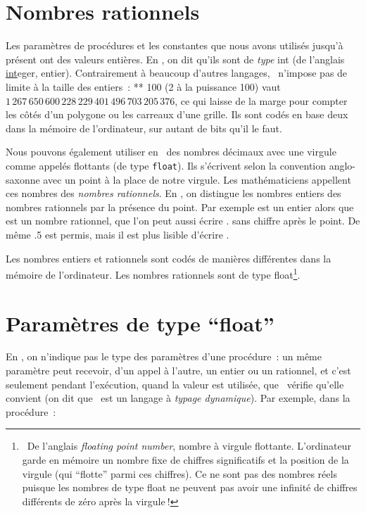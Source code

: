 \section{Nombres rationnels}
Les paramètres de procédures et les constantes que nous avons utilisés jusqu'à
présent ont des valeurs entières. En \python, on dit qu'ils sont de {\em type}
{\idt int} (de l'anglais \underline{int}eger, entier). Contrairement à beaucoup
d'autres langages, \python\ n'impose pas de limite à la taille des entiers~: { ** 100}
(2 à la puissance 100) vaut $1\,267\,650\,600\,228\,229\,401\,496\,703\,205\,376$, ce qui laisse
de la marge pour compter les côtés d'un polygone ou les carreaux d'une grille. Ils sont codés
en base deux dans la mémoire de l'ordinateur, sur autant de bits qu'il le faut.

Nous pouvons également utiliser en \python\ des nombres décimaux avec une virgule comme {} appelés flottants (de type \texttt{float}). Ils
s'écrivent selon la convention anglo-saxonne  avec un point à la place de notre
virgule. Les mathématiciens appellent ces nombres des {\em nombres rationnels}. En \python, on
distingue les nombres entiers des nombres rationnels par la présence du point. Par exemple
{} est un entier alors que {} est un nombre rationnel, que l'on peut
aussi écrire {.} sans chiffre après le point. De même {\idt .5} est permis, mais
il est plus lisible d'écrire {}.

Les nombres entiers et rationnels sont codés de manières différentes dans la mémoire
de l'ordinateur. Les nombres rationnels sont de type {\idt float}\footnote{\ De
l'anglais {\em floating point number}, nombre à virgule flottante. L'ordinateur
garde en mémoire un nombre fixe de chiffres significatifs et la position de la virgule
(qui ``flotte'' parmi ces chiffres). Ce ne sont pas des nombres
réels puisque les nombres de type {\idt float} ne peuvent pas avoir une infinité de chiffres
différents de zéro après la virgule$\:$!}.

\section{Paramètres de type ``float''}
En \python, on n'indique pas le type des paramètres d'une
procédure~: un même paramètre peut recevoir, d'un appel à l'autre, un entier ou un
rationnel, et c'est seulement pendant l'exécution, quand la valeur est utilisée,
que \python\ vérifie qu'elle convient (on dit que \python\ est un langage à
{\em typage dynamique}). Par exemple, dans la procédure~:

